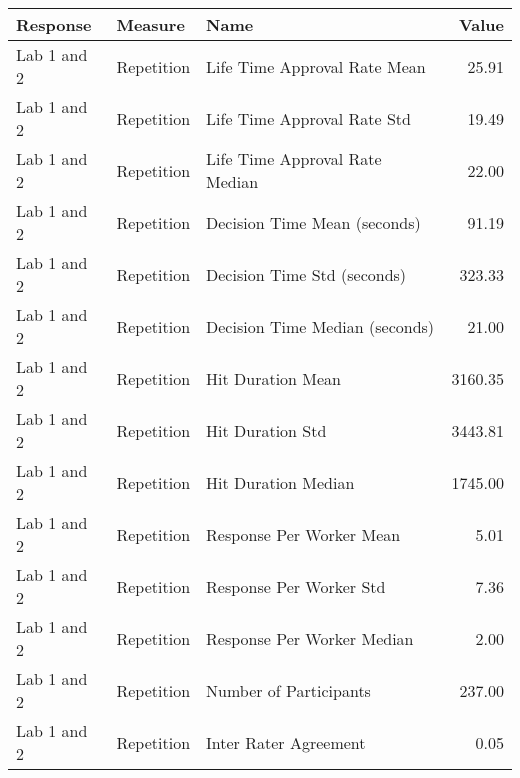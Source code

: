 \begin{tabular}{lllr}
\toprule
Response & Measure & Name & Value \\
\midrule
Lab 1 and 2 & Repetition & Life Time Approval Rate Mean & 25.91 \\
Lab 1 and 2 & Repetition & Life Time Approval Rate Std & 19.49 \\
Lab 1 and 2 & Repetition & Life Time Approval Rate Median & 22.00 \\
Lab 1 and 2 & Repetition & Decision Time Mean (seconds) & 91.19 \\
Lab 1 and 2 & Repetition & Decision Time Std (seconds) & 323.33 \\
Lab 1 and 2 & Repetition & Decision Time Median (seconds) & 21.00 \\
Lab 1 and 2 & Repetition & Hit Duration Mean & 3160.35 \\
Lab 1 and 2 & Repetition & Hit Duration Std & 3443.81 \\
Lab 1 and 2 & Repetition & Hit Duration Median & 1745.00 \\
Lab 1 and 2 & Repetition & Response Per Worker Mean & 5.01 \\
Lab 1 and 2 & Repetition & Response Per Worker Std & 7.36 \\
Lab 1 and 2 & Repetition & Response Per Worker Median & 2.00 \\
Lab 1 and 2 & Repetition & Number of Participants & 237.00 \\
Lab 1 and 2 & Repetition & Inter Rater Agreement & 0.05 \\
\bottomrule
\end{tabular}
